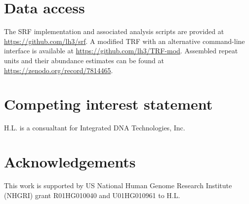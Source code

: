 \documentclass{bioinfo}
\begin{document}
\section{Data access}

The SRF implementation and associated analysis scripts are provided at
\href{https://github.com/lh3/srf}{https://github.com/lh3/srf}. A modified TRF
with an alternative command-line interface is available at
\href{https://github.com/lh3/TRF-mod}{https://github.com/lh3/TRF-mod}.
Assembled repeat units and their abundance estimates can be found at
\href{https://zenodo.org/record/7814465}{https://zenodo.org/record/7814465}.

\section{Competing interest statement}

H.L. is a consualtant for Integrated DNA Technologies, Inc.

\section{Acknowledgements}

This work is supported by US National Human Genome Research Institute (NHGRI)
grant R01HG010040 and U01HG010961 to H.L.


\end{document}
